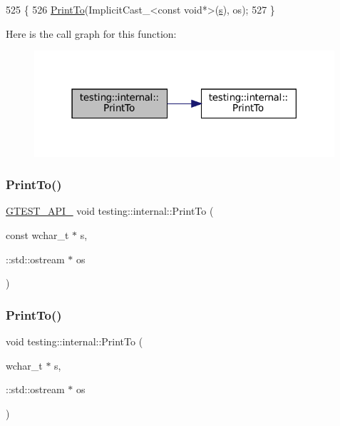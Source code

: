 \begin{DoxyCode}
525                                                       \{
526   \hyperlink{namespacetesting_1_1internal_af2c33928facbf2edf7af564278724d98}{PrintTo}(ImplicitCast\_<const void*>(\hyperlink{namespaceservice__node__3_aa976421a49e0b54f23833423400849ae}{s}), os);
527 \}
\end{DoxyCode}
Here is the call graph for this function\+:
\nopagebreak
\begin{figure}[H]
\begin{center}
\leavevmode
\includegraphics[width=316pt]{namespacetesting_1_1internal_a7fae797c500d66d0f5a9db4f205e3416_cgraph}
\end{center}
\end{figure}
\mbox{\label{namespacetesting_1_1internal_afb038075e9e2166d1d9158a19e0eed23}} 
\subsubsection{\texorpdfstring{Print\+To()}{PrintTo()}\hspace{0.1cm}{\footnotesize\ttfamily [16/20]}}
{\footnotesize\ttfamily \hyperlink{gtest-port_8h_aa73be6f0ba4a7456180a94904ce17790}{G\+T\+E\+S\+T\+\_\+\+A\+P\+I\+\_\+} void testing\+::internal\+::\+Print\+To (\begin{DoxyParamCaption}\item[{const wchar\+\_\+t $\ast$}]{s,  }\item[{\+::std\+::ostream $\ast$}]{os }\end{DoxyParamCaption})}

\mbox{\label{namespacetesting_1_1internal_a8d41baa371fad3eb5a3dbe1bbc02c290}} 
\subsubsection{\texorpdfstring{Print\+To()}{PrintTo()}\hspace{0.1cm}{\footnotesize\ttfamily [17/20]}}
{\footnotesize\ttfamily void testing\+::internal\+::\+Print\+To (\begin{DoxyParamCaption}\item[{wchar\+\_\+t $\ast$}]{s,  }\item[{\+::std\+::ostream $\ast$}]{os }\end{DoxyParamCaption})\hspace{0.3cm}{\ttfamily [inline]}}



